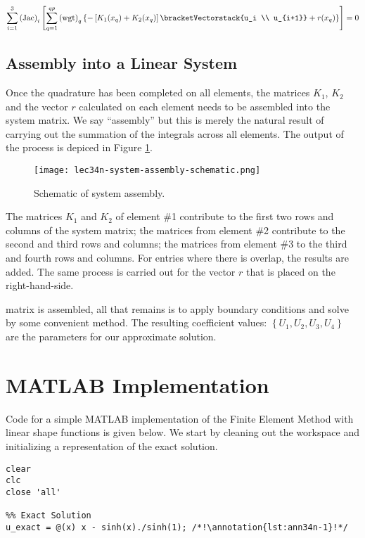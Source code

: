 \begin{equation*}
\sum\limits_{i=1}^{3} \text{(Jac)}_i\left[\sum\limits_{q=1}^{qp} \text{(wgt)}_q \left\{ -\left[K_1(x_{q})+K_2(x_{q}) \right]\bracketVectorstack{u_i \\ u_{i+1}}  + r(x_{q}) \right\}  \right] = 0
\end{equation*}

\subsection{Assembly into a Linear System}
Once the quadrature has been completed on all elements, the matrices $K_1$, $K_2$ and the vector $r$ calculated on each element needs to be assembled into the system matrix.  We say ``assembly'' but this is merely the natural result of carrying out the summation of the integrals across all elements.  The output of the process is depiced in Figure \ref{fig:lec34n-system-assembly-schematic}.    
\begin{figure}[h!]
\texttt{[image: lec34n-system-assembly-schematic.png]}
\caption{Schematic of system assembly.}
\label{fig:lec34n-system-assembly-schematic}
\end{figure}
The matrices $K_1$ and $K_2$ of element \#1 contribute to the first two rows and columns of the system matrix; the matrices from element \#2 contribute to the second and third rows and columns; the matrices from element \#3 to the third and fourth rows and columns.  For entries where there is overlap, the results are added.  The same process is carried out for the vector $r$ that is placed on the right-hand-side.

 matrix is assembled, all that remains is to apply boundary conditions and solve by some convenient method.  The resulting coefficient values: $\left\{U_1, U_2, U_3, U_4\right\}$ are the parameters for our approximate solution.  

\section{MATLAB Implementation}

Code for a simple MATLAB implementation of the Finite Element Method with linear shape functions is given below.  We start by cleaning out the workspace and initializing a representation of the exact solution.

\begin{lstlisting}[style=myMatlab,name=lec34n-ex1]
clear
clc
close 'all'

%% Exact Solution
u_exact = @(x) x - sinh(x)./sinh(1); /*!\annotation{lst:ann34n-1}!*/
\end{lstlisting}

